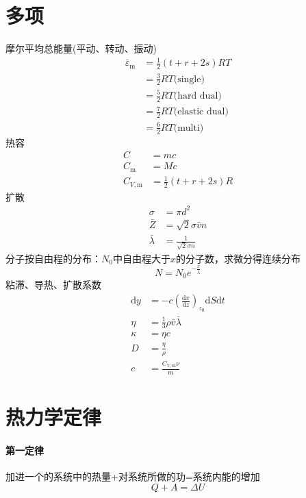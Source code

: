 \documentclass[10pt]{article}
\numberwithin{equation}{section}
\begin{document}
\begin{multicols}{3}
\begin{CJK}{UTF8}{gbsn}
\section{多项}
摩尔平均总能量(平动、转动、振动)
\begin{align}
  {\bar{\varepsilon}}_{\textrm{m}}&=\frac{1}{2}\left(t+r+2s\right)RT \nonumber \\ \nonumber
  &=\frac{3}{2}RT\textrm{(single)} \nonumber \\&=\frac{5}{2}RT\textrm{(hard dual)} \nonumber\\
  &=\frac{7}{2}RT\textrm{(elastic dual)} \nonumber \\ &=\frac{6}{2}RT\textrm{(multi)}
\end{align}
热容
\begin{align}
  C&=mc \\
  C_{\textrm{m}}&=Mc \\
  C_{V,\textrm{m}}&=\frac{1}{2}\left(t+r+2s\right)R
\end{align}
扩散
\begin{align}
  \sigma&=\pi d^2 \\
  \bar{Z}&=\sqrt2\sigma\bar{v}n \\
  \bar{\lambda}&=\frac{1}{\sqrt2\sigma n}
\end{align}
分子按自由程的分布：$N_0$中自由程大于$x$的分子数，求微分得连续分布
\begin{equation}
  N=N_0 e^{-\frac{x}{\bar{\lambda}}}
\end{equation}
粘滞、导热、扩散系数
\begin{align}
  \textrm{d}y&=-c\left(\frac{\textrm{d}x}{\textrm{d}z}\right)_{z_0}\textrm{d}S\textrm{d}t \\
  \eta&=\frac{1}{3}\rho\bar{v}\bar{\lambda} \\
  \kappa&=\eta c\\
  D&=\frac{\eta}{\rho} \\
  c&=\frac{C_{V,\textrm{m}}\nu}{m}
\end{align}

\section{热力学定律}
\paragraph{第一定律} 加进一个的系统中的热量+对系统所做的功=系统内能的增加
\begin{equation}
  Q+A=\Delta U
\end{equation}

\end{CJK}
\end{multicols}
\end{document}
